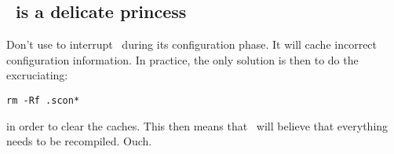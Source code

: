 \subsection{\scons\ is a delicate princess}

Don't use  to interrupt \scons\ during its configuration
phase.  It will cache incorrect configuration information.  In
practice, the only solution is then to do the excruciating:

\begin{transcript}
\begin{verbatim}
rm -Rf .scon*
\end{verbatim}
\end{transcript}

\noindent
in order to clear the caches.  This then means that \scons\ will
believe that everything needs to be recompiled.  Ouch.


